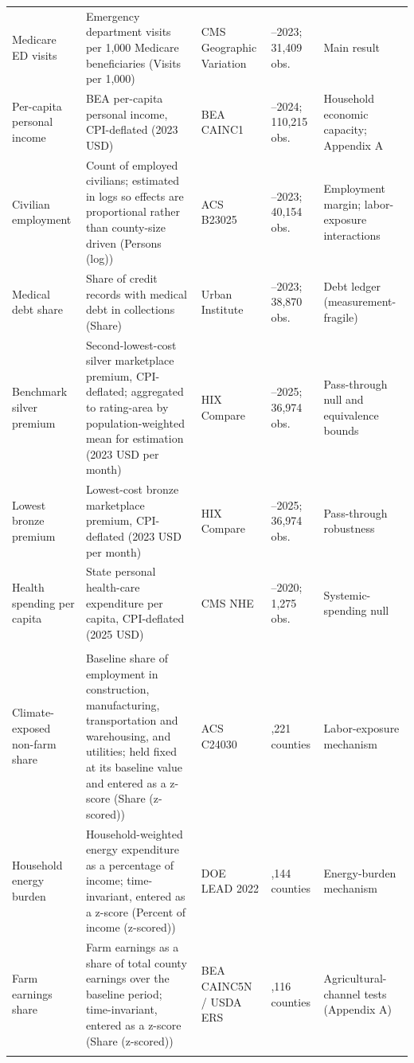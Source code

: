 \begin{longtable}{>{\raggedright\arraybackslash}p{2.7cm} >{\raggedright\arraybackslash}p{5.00cm} >{\raggedright\arraybackslash}p{2.1cm} >{\raggedright\arraybackslash}p{2.7cm} >{\raggedright\arraybackslash}p{2.5cm}}
Medicare ED visits & Emergency department visits per 1,000 Medicare beneficiaries (Visits per 1,000) & CMS Geographic Variation & 2014--2023; 31,409 obs. & Main result \\
Per-capita personal income & BEA per-capita personal income, CPI-deflated (2023 USD) & BEA CAINC1 & 1990--2024; 110,215 obs. & Household economic capacity; Appendix A \\
Civilian employment & Count of employed civilians; estimated in logs so effects are proportional rather than county-size driven (Persons (log)) & ACS B23025 & 2011--2023; 40,154 obs. & Employment margin; labor-exposure interactions \\
Medical debt share & Share of credit records with medical debt in collections (Share) & Urban Institute & 2011--2023; 38,870 obs. & Debt ledger (measurement-fragile) \\
Benchmark silver premium & Second-lowest-cost silver marketplace premium, CPI-deflated; aggregated to rating-area by population-weighted mean for estimation (2023 USD per month) & HIX Compare & 2014--2025; 36,974 obs. & Pass-through null and equivalence bounds \\
Lowest bronze premium & Lowest-cost bronze marketplace premium, CPI-deflated (2023 USD per month) & HIX Compare & 2014--2025; 36,974 obs. & Pass-through robustness \\
Health spending per capita & State personal health-care expenditure per capita, CPI-deflated (2025 USD) & CMS NHE & 1996--2020; 1,275 obs. & Systemic-spending null \\
\addlinespace
\multicolumn{5}{l}{\textit{Moderators}} \\
Climate-exposed non-farm share & Baseline share of employment in construction, manufacturing, transportation and warehousing, and utilities; held fixed at its baseline value and entered as a z-score (Share (z-scored)) & ACS C24030 & 3,221 counties & Labor-exposure mechanism \\
Household energy burden & Household-weighted energy expenditure as a percentage of income; time-invariant, entered as a z-score (Percent of income (z-scored)) & DOE LEAD 2022 & 3,144 counties & Energy-burden mechanism \\
Farm earnings share & Farm earnings as a share of total county earnings over the baseline period; time-invariant, entered as a z-score (Share (z-scored)) & BEA CAINC5N / USDA ERS & 3,116 counties & Agricultural-channel tests (Appendix A) \\
\addlinespace
\multicolumn{5}{l}{\textit{Auxiliary}} \\

\end{longtable}
